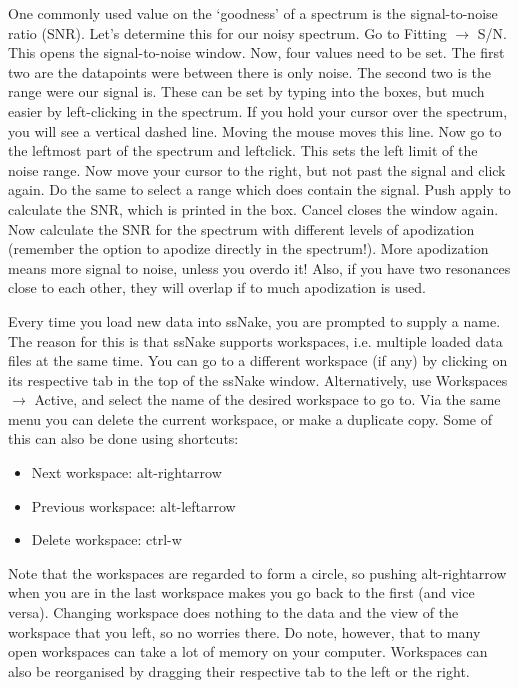 \documentclass[11pt,a4paper]{article}
\begin{document}
One commonly used value on the `goodness' of a spectrum is the signal-to-noise ratio (SNR). Let's determine this for our noisy spectrum. Go to Fitting $\rightarrow$ S/N. This opens the signal-to-noise window. Now, four values need to be set. The first two are the datapoints were between there is only noise. The second two is the range were our signal is. These can be set by typing into the boxes, but much easier by left-clicking in the spectrum. If you hold your cursor over the spectrum, you will see a vertical dashed line. Moving the mouse moves this line. Now go to the leftmost part of the spectrum and leftclick. This sets the left limit of the noise range. Now move your cursor to the right, but not past the signal and click again. Do the same to select a range which does contain the signal. Push apply to calculate the SNR, which is printed in the box. Cancel closes the window again. Now calculate the SNR for the spectrum with different levels of apodization (remember the option to apodize directly in the spectrum!). More apodization means more signal to noise, unless you overdo it! Also, if you have two resonances close to each other, they will overlap if to much apodization is used.


\begin{tcolorbox}[breakable,colback=green!5,colframe=MyGreenD,title=\large ssNake workspaces,boxrule=2mm,colback=MyGreenD!30!white]
Every time you load new data into ssNake, you are prompted to supply a name. The reason for this is that ssNake supports workspaces, i.e. multiple loaded data files at the same time. You can go to a different workspace (if any) by clicking on its respective tab in the top of the ssNake window. Alternatively, use Workspaces $\rightarrow$ Active, and select the name of the desired workspace to go to. Via the same menu you can delete the current workspace, or make a duplicate copy. Some of this can also be done using shortcuts:
\begin{itemize}
\item Next workspace: alt-rightarrow
\item Previous workspace: alt-leftarrow
\item Delete workspace: ctrl-w
\end{itemize}
Note that the workspaces are regarded to form a circle, so pushing alt-rightarrow when you are in the last workspace makes you go back to the first (and vice versa). Changing workspace does nothing to the data and the view of the workspace that you left, so no worries there. Do note, however, that to many open workspaces can take a lot of memory on your computer. Workspaces can also be reorganised by dragging their respective tab to the left or the right.
\end{tcolorbox}
\end{document}
